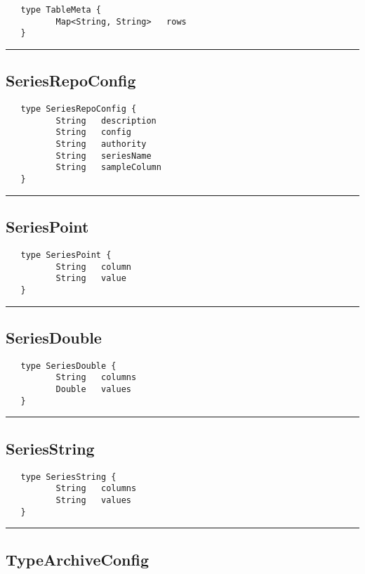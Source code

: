 \begin{verbatim}
   type TableMeta {
          Map<String, String>   rows
   }
\end{verbatim}

\rule{15cm}{2pt}
\subsection{SeriesRepoConfig}
\label{type:SeriesRepoConfig}

\begin{verbatim}
   type SeriesRepoConfig {
          String   description
          String   config
          String   authority
          String   seriesName
          String   sampleColumn
   }
\end{verbatim}

\rule{15cm}{2pt}
\subsection{SeriesPoint}
\label{type:SeriesPoint}

\begin{verbatim}
   type SeriesPoint {
          String   column
          String   value
   }
\end{verbatim}

\rule{15cm}{2pt}
\subsection{SeriesDouble}
\label{type:SeriesDouble}

\begin{verbatim}
   type SeriesDouble {
          String   columns
          Double   values
   }
\end{verbatim}

\rule{15cm}{2pt}
\subsection{SeriesString}
\label{type:SeriesString}

\begin{verbatim}
   type SeriesString {
          String   columns
          String   values
   }
\end{verbatim}

\rule{15cm}{2pt}
\subsection{TypeArchiveConfig}
\label{type:TypeArchiveConfig}


